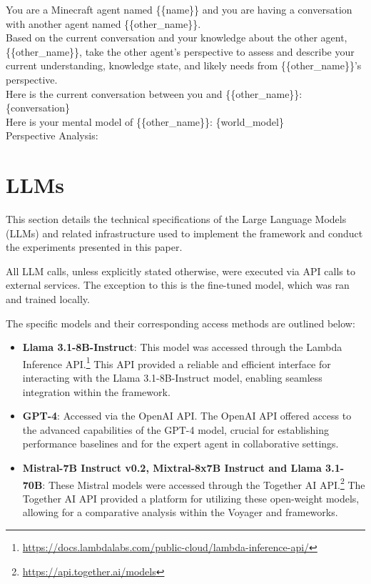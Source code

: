 \vspace{0.25cm}
\begin{tcolorbox}[title=Prompt for perspective-taking, label=box:prompt-perspective]
You are a Minecraft agent named \{\{name\}\} and you are having a conversation with another agent named \{\{other\_name\}\}. \\

Based on the current conversation and your knowledge about the other agent, \{\{other\_name\}\}, take the other agent's perspective to assess and describe your current understanding, knowledge state, and likely needs from \{\{other\_name\}\}'s perspective. \\

Here is the current conversation between you and \{\{other\_name\}\}:\{conversation\} \\

Here is your mental model of \{\{other\_name\}\}: \{world\_model\} \\

Perspective Analysis: 
\end{tcolorbox}

\section{LLMs} \label{appendix:llm}
This section details the technical specifications of the Large Language Models (LLMs) and related infrastructure used to implement the \collabvoyager framework and conduct the experiments presented in this paper.

All LLM calls, unless explicitly stated otherwise, were executed via API calls to external services. The exception to this is the fine-tuned model, which was ran and trained locally.

The specific models and their corresponding access methods are outlined below:

\begin{itemize}
    \item \textbf{Llama 3.1-8B-Instruct}: This model was accessed through the Lambda Inference API.\footnote{\url{https://docs.lambdalabs.com/public-cloud/lambda-inference-api/}} This API provided a reliable and efficient interface for interacting with the Llama 3.1-8B-Instruct model, enabling seamless integration within the \collabvoyager framework.
    \item \textbf{GPT-4}:  Accessed via the OpenAI API. The OpenAI API offered access to the advanced capabilities of the GPT-4 model, crucial for establishing performance baselines and for the expert agent in collaborative settings.
    \item \textbf{Mistral-7B Instruct v0.2, Mixtral-8x7B Instruct and Llama 3.1-70B}: These Mistral models were accessed through the Together AI API.\footnote{\url{https://api.together.ai/models}} The Together AI API provided a platform for utilizing these open-weight models, allowing for a comparative analysis within the Voyager and \collabvoyager frameworks.
\end{itemize}